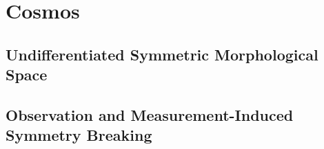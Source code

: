 \usepackage{lipsum}

\usepackage{amsmath,amssymb,graphicx,hyperref,tcolorbox}
\usepackage{braket}

\usepackage{tikz}
\usetikzlibrary{patterns} %
\usetikzlibrary{decorations.pathmorphing} %
\usetikzlibrary{positioning} %

\DeclareMathOperator{\Tr}{Tr}




\coverpage{\TITLE}{\SUBTITLE}{\AUTHOR}{\DATE}{\SUBJECT}
\newpage
\backgroundbarvisiblefalse
\pagestyle{plain}




\newpage
\tableofcontents

\part{Cosmos}
\newpage

\chapter{Undifferentiated Symmetric Morphological Space} \label{ch:UndifferentiatedSymmetricMorphologicalSpace}

\newpage
\chapter{Observation and Measurement-Induced Symmetry Breaking}\label{ch:ObservationandMeasurementInducedSymmetryBreaking}

\newpage
